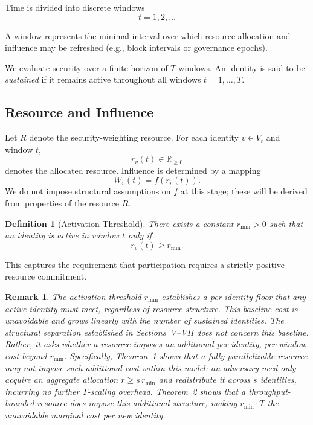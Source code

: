 \documentclass[journal]{IEEEtran}
\newtheorem{definition}{Definition}
\newtheorem{remark}{Remark}
\begin{document}
	Time is divided into discrete windows
	\[
	t = 1,2,\dots
	\]
	
	A window represents the minimal interval over which resource allocation
	and influence may be refreshed (e.g., block intervals or governance epochs).
	
	We evaluate security over a finite horizon of $T$ windows.
	An identity is said to be \emph{sustained} if it remains active
	throughout all windows $t = 1,\dots,T$.
	
	\subsection{Resource and Influence}
	Let $R$ denote the security-weighting resource.
	For each identity $v \in V_t$ and window $t$,
	\[
	r_v(t) \in \mathbb{R}_{\ge 0}
	\]
	denotes the allocated resource.
	Influence is determined by a mapping
	\[
	W_v(t) = f(r_v(t)).
	\]
	We do not impose structural assumptions on $f$ at this stage;
	these will be derived from properties of the resource $R$.
	
	\begin{definition}[Activation Threshold]
		There exists a constant $r_{\min} > 0$ such that
		an identity is active in window $t$ only if
		\[
		r_v(t) \ge r_{\min}.
		\]
	\end{definition}
	
	This captures the requirement that participation requires
	a strictly positive resource commitment.
	
	\begin{remark}
		The activation threshold $r_{\min}$ establishes a per-identity
		floor that any active identity must meet, regardless of resource
		structure.  This baseline cost is unavoidable and grows linearly
		with the number of sustained identities.  The structural
		separation established in Sections~V--VII does \emph{not} concern
		this baseline.  Rather, it asks whether a resource imposes an
		\emph{additional} per-identity, per-window cost beyond $r_{\min}$.
		Specifically, Theorem~1 shows that a fully parallelizable resource
		may not impose such additional cost within this model: an adversary need only acquire
		an aggregate allocation $r \ge s\,r_{\min}$ and redistribute it
		across $s$ identities, incurring no further $T$-scaling overhead.
		Theorem~2 shows that a throughput-bounded resource does impose this
		additional structure, making $r_{\min} \cdot T$ the unavoidable
		marginal cost per new identity.
	\end{remark}
	
\end{document}
